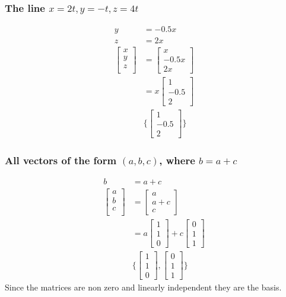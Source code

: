 \documentclass[12pt, a4paper]{article}
\begin{document}
			\subsubsection{The line $x=2t,y=-t,z=4t$}
				\begin{align*}
					y&=-0.5x\\
					z&=2x\\
					\begin{bmatrix} x \\ y\\ z\\\end{bmatrix}&=\begin{bmatrix}x\\-0.5x\\2x\end{bmatrix}\\
					&=x\begin{bmatrix}1\\-0.5\\2\end{bmatrix}\\
					&\{\begin{bmatrix}1\\-0.5\\2\end{bmatrix}\}
				\end{align*}
			
			\subsubsection{All vectors of the form $(a,b,c)$, where $b=a+c$}
				\begin{align*}
					b&=a+c\\
					\begin{bmatrix} a \\ b\\ c\\\end{bmatrix}&=\begin{bmatrix}a\\a+c\\c\end{bmatrix}\\
					&=a\begin{bmatrix}1\\1\\0\end{bmatrix}+c\begin{bmatrix}0\\1\\1\end{bmatrix}\\
					&\{\begin{bmatrix}1\\1\\0\end{bmatrix},\begin{bmatrix}0\\1\\1\end{bmatrix}\}
				\end{align*}
				Since the matrices are non zero and linearly independent they are the basis.
\end{document}
